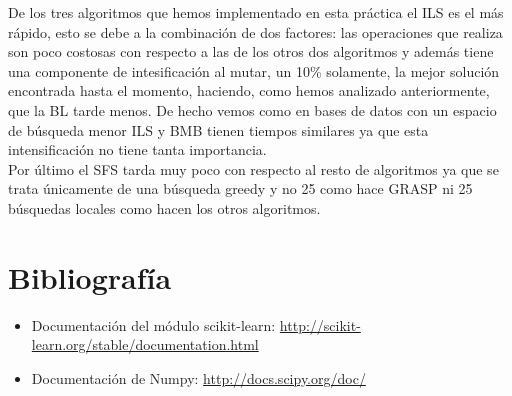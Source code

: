 \documentclass[10pt,a4paper]{article}
\begin{document}
De los tres algoritmos que hemos implementado en esta práctica el ILS es el más rápido, esto se debe a la combinación de dos factores: las operaciones que realiza son poco costosas con respecto a las de los otros dos algoritmos y además tiene una componente de intesificación al mutar, un 10\% solamente, la mejor solución encontrada hasta el momento, haciendo, como hemos analizado anteriormente, que la BL tarde menos. De hecho vemos como en bases de datos con un espacio de búsqueda menor ILS y BMB tienen tiempos similares ya que esta intensificación no tiene tanta importancia.\\

Por último el SFS tarda muy poco con respecto al resto de algoritmos ya que se trata únicamente de una búsqueda greedy y no 25 como hace GRASP ni 25 búsquedas locales como hacen los otros algoritmos.\\

\newpage
\section{\color[rgb]{0.0,0.0,0.21}Bibliografía}

\begin{itemize}
\item Documentación del módulo scikit-learn: \url{http://scikit-learn.org/stable/documentation.html}
\item Documentación de Numpy: \url{http://docs.scipy.org/doc/}
\end{itemize}
\end{document}
